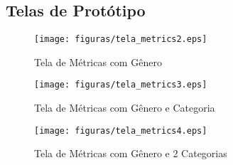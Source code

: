 \begin{anexosenv}

\partanexos

\chapter{Telas de Protótipo}
\label{anexo:prototipe}
\begin{figure}
\centering
\texttt{[image: figuras/tela\_metrics2.eps]}
\caption{Tela de Métricas com Gênero}
\end{figure}
\begin{figure}
\centering
\texttt{[image: figuras/tela\_metrics3.eps]}
\caption{Tela de Métricas com Gênero e Categoria}
\end{figure}
\begin{figure}
\centering
\texttt{[image: figuras/tela\_metrics4.eps]}
\caption{Tela de Métricas com Gênero e 2 Categorias}
\end{figure}

\end{anexosenv}

